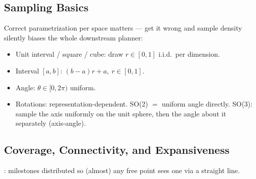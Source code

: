 \subsection{Sampling Basics}
Correct parametrization per space matters — get it wrong and sample density silently biases the whole downstream planner:
\begin{itemize}
\item Unit interval / square / cube: draw $r\in[0,1]$ i.i.d.\ per dimension.
\item Interval $[a,b]$: $(b-a)r+a,\ r\in[0,1]$.
\item Angle: $\theta\in[0,2\pi)$ uniform.
\item Rotations: representation-dependent. SO(2) $=$ uniform angle directly. SO(3): sample the axis uniformly on the unit sphere, then the angle about it separately (axis-angle).
\end{itemize}

\subsection{Coverage, Connectivity, and Expansiveness}
: milestones distributed so (almost) any free point sees one via a straight line.

